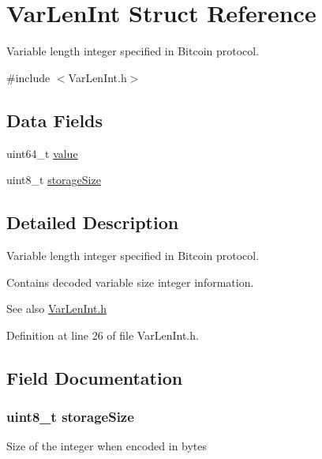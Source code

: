 \hypertarget{struct_var_len_int}{
\section{VarLenInt Struct Reference}
\label{struct_var_len_int}
}


Variable length integer specified in Bitcoin protocol.  




{\ttfamily \#include $<$VarLenInt.h$>$}

\subsection*{Data Fields}
\begin{DoxyCompactItemize}
\item 
uint64\_\-t \hyperlink{struct_var_len_int_a4e630859cc0e2a22bd6acf39a6a8e218}{value}
\item 
uint8\_\-t \hyperlink{struct_var_len_int_af922c72fe1d5915971491918ff5f923e}{storageSize}
\end{DoxyCompactItemize}


\subsection{Detailed Description}
Variable length integer specified in Bitcoin protocol. 

Contains decoded variable size integer information. \begin{DoxySeeAlso}{See also}
\hyperlink{_var_len_int_8h}{VarLenInt.h} 
\end{DoxySeeAlso}


Definition at line 26 of file VarLenInt.h.



\subsection{Field Documentation}
\hypertarget{struct_var_len_int_af922c72fe1d5915971491918ff5f923e}{
\subsubsection[{storageSize}]{\setlength{\rightskip}{0pt plus 5cm}uint8\_\-t {\bf storageSize}}}
\label{struct_var_len_int_af922c72fe1d5915971491918ff5f923e}
Size of the integer when encoded in bytes 

